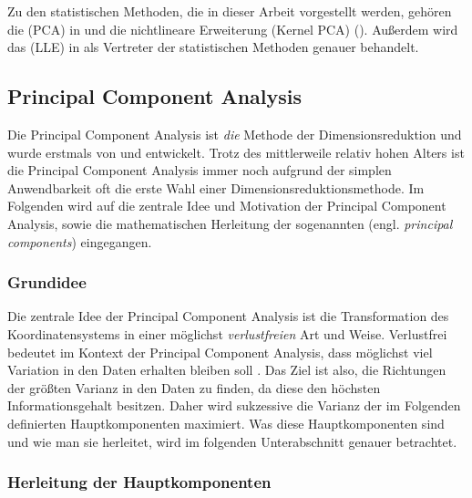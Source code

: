 Zu den statistischen Methoden, die in dieser Arbeit vorgestellt werden, gehören die
 (PCA) in 
und die nichtlineare Erweiterung  (Kernel PCA)
(). Außerdem wird das  (LLE) in  als Vertreter der
statistischen Methoden genauer behandelt.

\subsection{Principal Component Analysis}
\label{ch:MethodenDerDimRed:statistisch:PCA}

Die Principal Component Analysis ist \textit{die} Methode der Dimensionsreduktion und wurde
erstmals von \textcite{Pearson.1901} und \textcite{Hotelling.1933} entwickelt. Trotz des
mittlerweile relativ hohen Alters ist die Principal Component Analysis immer noch aufgrund der
simplen Anwendbarkeit oft die erste Wahl einer Dimensionsreduktionsmethode. Im Folgenden wird auf
die zentrale Idee und Motivation der Principal Component Analysis, sowie die mathematischen
Herleitung der sogenannten  (engl. \textit{principal components})
eingegangen.

\subsubsection{Grundidee}
\label{ch:MethodenDerDimRed:statistisch:PCA:Grundidee}
Die zentrale Idee der Principal Component Analysis ist die Transformation des Koordinatensystems in einer möglichst \textit{verlustfreien} Art und Weise. Verlustfrei bedeutet im Kontext der Principal Component Analysis, dass möglichst viel Variation in den Daten erhalten bleiben soll \parencite[vgl.][1]{Jolliffe.2002}. Das Ziel ist also, die Richtungen der größten Varianz in den Daten
zu finden, da diese den höchsten Informationsgehalt besitzen. Daher wird sukzessive die Varianz der
im Folgenden definierten Hauptkomponenten maximiert. Was diese Hauptkomponenten sind und wie man
sie herleitet, wird im folgenden Unterabschnitt genauer betrachtet.

\subsubsection{Herleitung der Hauptkomponenten}
\label{ch:MethodenDerDimRed:statistisch:PCA:HerleitungPC}

